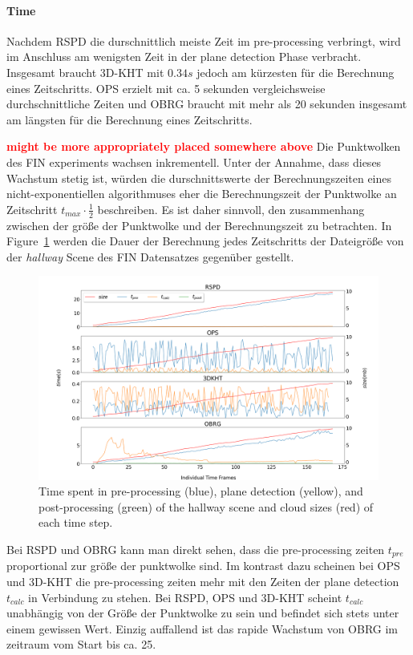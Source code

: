 \documentclass[main.tex]{subfiles}
\begin{document}
\paragraph{Time}
Nachdem RSPD die durschnittlich meiste Zeit im pre-processing verbringt, wird im Anschluss am wenigsten 
Zeit in der plane detection Phase verbracht. Insgesamt braucht 3D-KHT mit $0.34s$ jedoch am kürzesten für die Berechnung 
eines Zeitschritts. OPS erzielt mit ca. 5 sekunden vergleichsweise durchschnittliche Zeiten und OBRG 
braucht mit mehr als 20 sekunden insgesamt am längsten für die Berechnung eines Zeitschritts.

\textbf{\textcolor{red}{might be more appropriately placed somewhere above}}
Die Punktwolken des FIN experiments wachsen inkrementell. Unter der Annahme, dass dieses Wachstum stetig ist,
würden die durschnittswerte der Berechnungszeiten eines nicht-exponentiellen algorithmuses eher die Berechnungszeit
der Punktwolke an Zeitschritt $t_{max} \cdot \frac{1}{2}$ beschreiben.
Es ist daher sinnvoll, den zusammenhang zwischen der größe der Punktwolke und der Berechnungszeit zu betrachten.
In Figure~\ref{fig:dynhallway} werden die Dauer der Berechnung jedes Zeitschritts der Dateigröße von der
 \textit{hallway} Scene des FIN Datensatzes gegenüber gestellt. 

\begin{figure}[H]
    \centering
    \includegraphics[width=\textwidth]{images/dyn_time-hallway.png}
    \caption[Time Results Hallway]{Time spent in pre-processing (blue), plane detection (yellow), and post-processing 
    (green) of the hallway scene and cloud sizes (red) of each time step.}
    \label{fig:dynhallway}
\end{figure}

Bei RSPD und OBRG kann man direkt sehen, dass die pre-processing zeiten $t_{pre}$ proportional zur größe der punktwolke
 sind. Im kontrast dazu scheinen bei OPS und 3D-KHT die pre-processing zeiten mehr mit den Zeiten der plane detection 
 $t_{calc}$ in Verbindung zu stehen. Bei RSPD, OPS und 3D-KHT scheint $t_{calc}$ unabhängig von der Größe der Punktwolke 
 zu sein und befindet sich stets unter einem gewissen Wert. Einzig auffallend ist das rapide Wachstum von OBRG im zeitraum
 vom Start bis ca. 25.  
\end{document}
